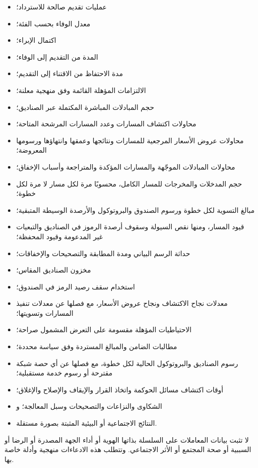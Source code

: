 \documentclass[11pt]{article}
\begin{document}
\begin{itemize}[leftmargin=*]
\item عمليات تقديم صالحة للاسترداد؛
\item معدل الوفاء بحسب الفئة؛
\item اكتمال الإبراء؛
\item المدة من التقديم إلى الوفاء؛
\item مدة الاحتفاظ من الاقتناء إلى التقديم؛
\item الالتزامات المؤهلة القائمة وفق منهجية معلنة؛
\item حجم المبادلات المباشرة المكتملة عبر الصناديق؛
\item محاولات اكتشاف المسارات وعدد المسارات المرشحة المتاحة؛
\item محاولات عروض الأسعار المرجعية للمسارات ونتائجها وعمقها وانتهاؤها ورسومها المعروضة؛
\item محاولات المبادلات الموجّهة والمسارات المؤكدة والمتراجعة وأسباب الإخفاق؛
\item حجم المدخلات والمخرجات للمسار الكامل، محسوبًا مرة لكل مسار لا مرة لكل خطوة؛
\item مبالغ التسوية لكل خطوة ورسوم الصندوق والبروتوكول والأرصدة الوسيطة المتبقية؛
\item قيود المسار، ومنها نقص السيولة وسقوف أرصدة الرموز في الصناديق والتبعيات غير المدعومة وقيود المحفظة؛
\item حداثة الرسم البياني ومدة المطابقة والتصحيحات والإخفاقات؛
\item مخزون الصناديق المقاس؛
\item استخدام سقف رصيد الرمز في الصندوق؛
\item معدلات نجاح الاكتشاف ونجاح عروض الأسعار، مع فصلها عن معدلات تنفيذ المسارات وتسويتها؛
\item الاحتياطيات المؤهلة مقسومة على التعرض المشمول صراحة؛
\item مطالبات الضامن والمبالغ المستردة وفق سياسة محددة؛
\item رسوم الصناديق والبروتوكول الحالية لكل خطوة، مع فصلها عن أي حصة شبكة مقترحة أو رسوم خدمة مستقبلية؛
\item أوقات اكتشاف مسائل الحوكمة واتخاذ القرار والإيقاف والإصلاح والإغلاق؛
\item الشكاوى والنزاعات والتصحيحات وسبل المعالجة؛ و
\item النتائج الاجتماعية أو البيئية المثبتة بصورة مستقلة.
\end{itemize}
لا تثبت بيانات المعاملات على السلسلة بذاتها الهوية أو أداء الجهة المصدرة أو الرضا أو السببية أو صحة المجتمع أو الأثر الاجتماعي. وتتطلب هذه الادعاءات منهجية وأدلة خاصة بها.
\end{document}
